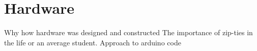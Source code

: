 \section{Hardware}
Why how hardware was designed and constructed
The importance of zip-ties in the life or an average student.
Approach to arduino code